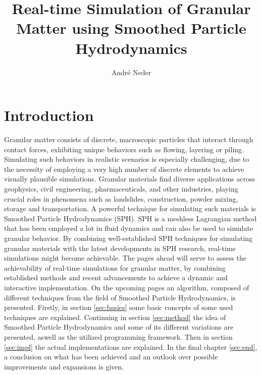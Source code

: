\documentclass[intern]{cgMA}
\title{Real-time Simulation of Granular Matter using Smoothed Particle Hydrodynamics}
\author{André Neder}
\begin{document}
    \maketitle
    \newpage
    \tableofcontents
    \newpage
    \section{Introduction}

    Granular matter consists of discrete, macroscopic particles that interact through contact forces, exhibiting unique behaviors such as flowing, layering or piling. Simulating such behaviors in realistic scenarios is especially challenging, due to the necessity of employing a very high number of discrete elements to achieve visually plausible simulations. Granular materials find diverse applications across geophysics, civil engineering, pharmaceuticals, and other industries, playing crucial roles in phenomena such as landslides, construction, powder mixing, storage and transportation. A powerful technique for simulating such materials is Smoothed Particle Hydrodynamics (SPH). SPH is a meshless Lagrangian method that has been employed a lot in fluid dynamics and can also be used to simulate granular behavior. By combining well-established SPH techniques for simulating granular materials with the latest developments in SPH research, real-time simulations might become achievable. The pages ahead will serve to assess the achievability of real-time simulations for granular matter, by combining established methods and recent advancements to achieve a dynamic and interactive implementation. On the upcoming pages an algorithm, composed of different techniques from the field of Smoothed Particle Hydrodynamics, is presented. 
    Firstly, in section \ref{sec:basics} some basic concepts of some used techniques are explained. Continuing in section \ref{sec:method} the idea of Smoothed Particle Hydrodynamics and some of its different variations are presented, aswell as the utilized programming framework. Then in section \ref{sec:impl} the actual implementations are explained. In the final chapter \ref{sec:end}, a conclusion on what has been achieved and an outlook over possible improvements and expansions is given. %
    \pagebreak
\end{document}
